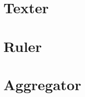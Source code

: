 \section{Texter}
\label{sec:4_approach/1_texter}



\section{Ruler}
\label{sec:4_approach/2_ruler}



\section{Aggregator}
\label{sec:4_approach/3_aggregator}

